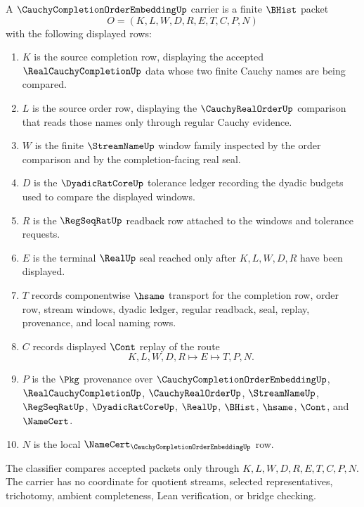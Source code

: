 \begin{definition}
\label{def:cauchy-completion-order-embedding-carrier}
A $\CauchyCompletionOrderEmbeddingUp$ carrier is a finite $\BHist$ packet
$$
O=(K,L,W,D,R,E,T,C,P,N)
$$
with the following displayed rows:
\begin{enumerate}
\item $K$ is the source completion row, displaying the accepted $\RealCauchyCompletionUp$ data whose two finite Cauchy names are being compared.
\item $L$ is the source order row, displaying the $\CauchyRealOrderUp$ comparison that reads those names only through regular Cauchy evidence.
\item $W$ is the finite $\StreamNameUp$ window family inspected by the order comparison and by the completion-facing real seal.
\item $D$ is the $\DyadicRatCoreUp$ tolerance ledger recording the dyadic budgets used to compare the displayed windows.
\item $R$ is the $\RegSeqRatUp$ readback row attached to the windows and tolerance requests.
\item $E$ is the terminal $\RealUp$ seal reached only after $K,L,W,D,R$ have been displayed.
\item $T$ records componentwise $\hsame$ transport for the completion row, order row, stream windows, dyadic ledger, regular readback, seal, replay, provenance, and local naming rows.
\item $C$ records displayed $\Cont$ replay of the route
$$
K,L,W,D,R \longmapsto E \longmapsto T,P,N .
$$
\item $P$ is the $\Pkg$ provenance over $\CauchyCompletionOrderEmbeddingUp$, $\RealCauchyCompletionUp$, $\CauchyRealOrderUp$, $\StreamNameUp$, $\RegSeqRatUp$, $\DyadicRatCoreUp$, $\RealUp$, $\BHist$, $\hsame$, $\Cont$, and $\NameCert$.
\item $N$ is the local $\NameCert_{\CauchyCompletionOrderEmbeddingUp}$ row.
\end{enumerate}
The classifier compares accepted packets only through $K,L,W,D,R,E,T,C,P,N$. The carrier has no coordinate for quotient streams, selected representatives, trichotomy, ambient completeness, Lean verification, or bridge checking.
\end{definition}

